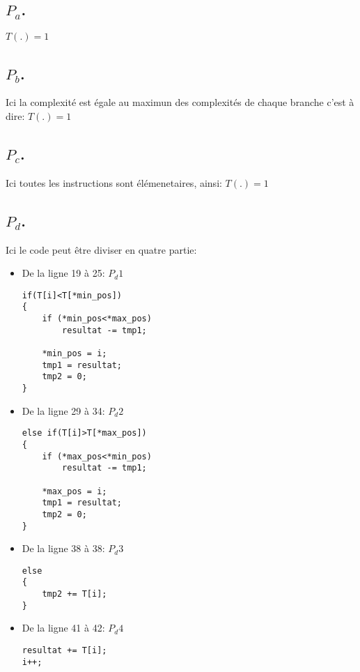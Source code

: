 \subsection[c]{$P_a$.}

$T(.)=1$

\subsection[c]{$P_b$.}

Ici la complexité est égale au maximun des complexités de chaque branche c'est à dire: $T(.)=1$

\subsection[c]{$P_c$.}

Ici toutes les instructions sont élémenetaires, ainsi: $T(.)=1$

\subsection[c]{$P_d$.}

Ici le code peut être diviser en quatre partie:

\begin{itemize}

\item De la ligne 19 à 25: $P_d1$ 
\begin{lstlisting}
if(T[i]<T[*min_pos])
{
    if (*min_pos<*max_pos) 
        resultat -= tmp1;
        
    *min_pos = i;
    tmp1 = resultat;
    tmp2 = 0;
}
\end{lstlisting}

\item De la ligne 29 à 34: $P_d2$ 
\begin{lstlisting}
else if(T[i]>T[*max_pos])
{
    if (*max_pos<*min_pos) 
        resultat -= tmp1;
    
    *max_pos = i;
    tmp1 = resultat;
    tmp2 = 0;
}
\end{lstlisting}

\item De la ligne 38 à 38: $P_d3$ 
\begin{lstlisting}
else 
{
    tmp2 += T[i];
}
\end{lstlisting}

\item De la ligne 41 à 42: $P_d4$ 
\begin{lstlisting}
resultat += T[i];
i++;
\end{lstlisting}

\end{itemize}

